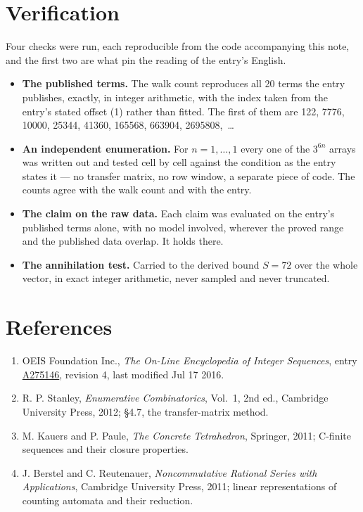 \documentclass[11pt]{article}
\theoremstyle{definition}
\begin{document}
\section{Verification}

Four checks were run, each reproducible from the code accompanying this note, and the first two are what pin the reading of the entry's English.

\begin{itemize}

\item {\bfseries The published terms.} The walk count reproduces all 20 terms the entry publishes, exactly, in integer arithmetic, with the index taken from the entry's stated offset (1) rather than fitted. The first of them are 122, 7776, 10000, 25344, 41360, 165568, 663904, 2695808,~\dots

\item {\bfseries An independent enumeration.} For $n = 1,\dots,1$ every one of the $3^{6n}$ arrays was written out and tested cell by cell against the condition as the entry states it --- no transfer matrix, no row window, a separate piece of code. The counts agree with the walk count and with the entry.

\item {\bfseries The claim on the raw data.} Each claim was evaluated on the entry's published terms alone, with no model involved, wherever the proved range and the published data overlap. It holds there.

\item {\bfseries The annihilation test.} Carried to the derived bound $S = 72$ over the whole vector, in exact integer arithmetic, never sampled and never truncated.

\end{itemize}

\section{References}

\begin{enumerate}

\item OEIS Foundation Inc., \emph{The On-Line Encyclopedia of Integer Sequences}, entry \href{https://oeis.org/A275146}{A275146}, revision 4, last modified Jul 17 2016.

\item R. P. Stanley, \emph{Enumerative Combinatorics}, Vol.~1, 2nd ed., Cambridge University Press, 2012; \S4.7, the transfer-matrix method.

\item M. Kauers and P. Paule, \emph{The Concrete Tetrahedron}, Springer, 2011; C-finite sequences and their closure properties.

\item J. Berstel and C. Reutenauer, \emph{Noncommutative Rational Series with Applications}, Cambridge University Press, 2011; linear representations of counting automata and their reduction.

\end{enumerate}
\end{document}
